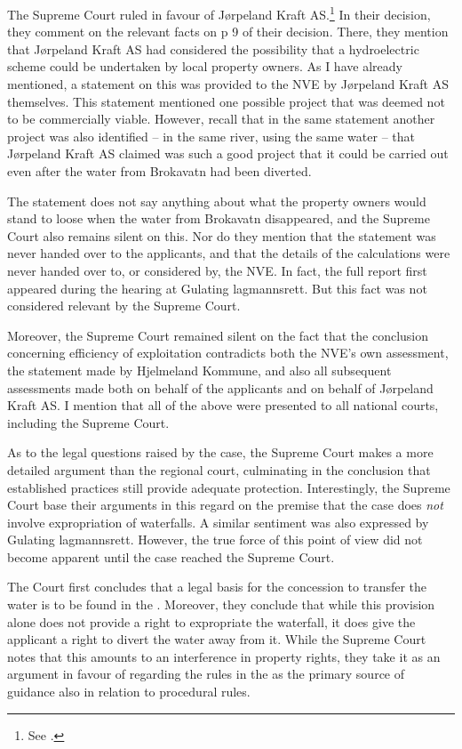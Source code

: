The Supreme Court ruled in favour of Jørpeland Kraft AS.\footnote{See \cite{jorpeland11}.} In their decision, they comment on the relevant facts on p 9 of their decision. There, they mention that Jørpeland Kraft AS had considered the possibility that a hydroelectric scheme could be undertaken by local property owners. As I have already mentioned, a statement on this was provided to the NVE by Jørpeland Kraft AS themselves. This statement mentioned one possible project that was deemed not to be commercially viable. However, recall that in the same statement another project was also identified -- in the same river, using the same water -- that Jørpeland Kraft AS claimed was such a good project that it could be carried out even after the water from Brokavatn had been diverted.

The statement does not say anything about what the property owners would stand to loose when the water from Brokavatn disappeared, and the Supreme Court also remains silent on this. Nor do they mention that the statement was never handed over to the applicants, and that the details of the calculations were never handed over to, or considered by, the NVE. In fact, the full report first appeared during the hearing at Gulating lagmannsrett. But this fact was not considered relevant by the Supreme Court.

Moreover, the Supreme Court remained silent on the fact that the conclusion concerning efficiency of exploitation contradicts both the NVE's own assessment, the statement made by Hjelmeland Kommune, and also all subsequent assessments made both on behalf of the applicants and on behalf of Jørpeland Kraft AS. I mention that all of the above were presented to all national courts, including the Supreme Court.

As to the legal questions raised by the case, the Supreme Court makes a more detailed argument than the regional court, culminating in the conclusion that established practices still provide adequate protection. Interestingly, the Supreme Court base their arguments in this regard on the premise that the case does \emph{not} involve expropriation of waterfalls. A similar sentiment was also expressed by Gulating lagmannsrett. However, the true force of this point of view did not become apparent until the case reached the Supreme Court.

The Court first concludes that a legal basis for the concession to transfer the water is to be found in the \cite[16]{wra17}. Moreover, they conclude that while this provision alone does not provide a right to expropriate the waterfall, it does give the applicant a right to divert the water away from it. While the Supreme Court notes that this amounts to an interference in property rights, they take it as an argument in favour of regarding the rules in the \cite{wra17} as the primary source of guidance also in relation to procedural rules. 

